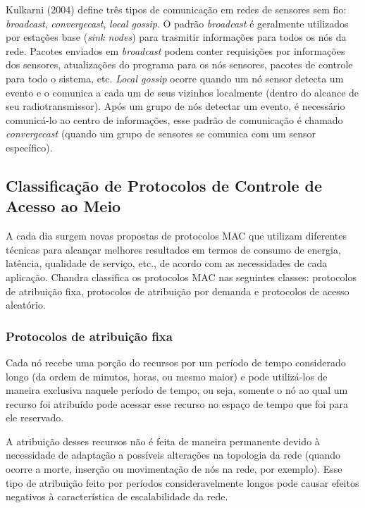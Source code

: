 Kulkarni (2004) \cite{Kulkarni2004} define três tipos de comunicação em redes de sensores sem fio: \textit{broadcast}, \textit{convergecast}, \textit{local gossip}. O padrão \textit{broadcast} é geralmente utilizados por estações base (\textit{sink nodes}) para trasmitir informações para todos os nós da rede. Pacotes enviados em \textit{broadcast} podem conter requisições por informações dos sensores, atualizações do programa para os nós sensores, pacotes de controle para todo o sistema, etc. \textit{Local gossip} ocorre quando um nó sensor detecta um evento e o comunica a cada um de seus vizinhos localmente (dentro do alcance de seu radiotransmissor). Após um grupo de nós detectar um evento, é necessário comunicá-lo ao centro de informações, esse padrão de comunicação é chamado \textit{convergecast} (quando um grupo de sensores se comunica com um sensor específico).

\subsection{Classificação de Protocolos de Controle de Acesso ao Meio}

A cada dia surgem novas propostas de protocolos MAC que utilizam diferentes técnicas para alcançar melhores resultados em termos de consumo de energia, latência, qualidade de serviço, etc., de acordo com as necessidades de cada aplicação. Chandra \cite{Chandra_2wireless} classifica os protocolos MAC nas seguintes classes: protocolos de atribuição fixa, protocolos de atribuição por demanda e protocolos de acesso aleatório.

 \subsubsection{Protocolos de atribuição fixa} 
 
 Cada nó recebe uma porção do recursos por um período de tempo considerado longo (da ordem de minutos, horas, ou mesmo maior) e pode utilizá-los de maneira exclusiva naquele período de tempo, ou seja, somente o nó ao qual um recurso foi atribuído pode acessar esse recurso no espaço de tempo que foi para ele reservado. 
 
 A atribuição desses recursos não é feita de maneira permanente devido à necessidade de adaptação a possíveis alterações na topologia da rede (quando ocorre a morte, inserção ou movimentação de nós na rede, por exemplo). Esse tipo de atribuição feito por períodos consideravelmente longos pode causar efeitos negativos à característica de escalabilidade da rede. 
 
